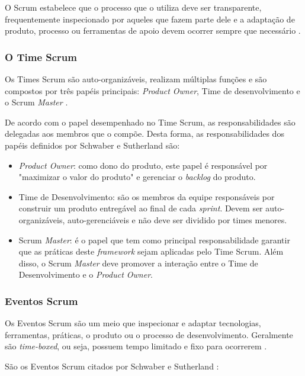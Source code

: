 O Scrum estabelece que o processo que o utiliza deve ser transparente, frequentemente inspecionado por aqueles que fazem parte dele e a adaptação de produto, processo ou ferramentas de apoio devem ocorrer sempre que necessário \cite{schwaber_guia_2013}.

\subsubsection{O Time Scrum}
Os Times Scrum são auto-organizáveis, realizam múltiplas funções e são compostos por três papéis principais: \textit{Product Owner}, Time de desenvolvimento e o Scrum \textit{Master} \cite{schwaber_guia_2013}.

De acordo com o papel desempenhado no Time Scrum, as responsabilidades são delegadas aos membros que o compõe. Desta forma, as responsabilidades dos papéis definidos por Schwaber e Sutherland \cite{schwaber_guia_2013} são:

\begin{itemize}
\item \textit{Product Owner}: como dono do produto, este papel é responsável por "maximizar o valor do produto" e gerenciar o \textit{backlog} do produto.

\item Time de Desenvolvimento: são os membros da equipe responsáveis por construir um produto entregável ao final de cada \textit{sprint}. Devem ser auto-organizáveis, auto-gerenciáveis e não deve ser dividido por times menores.

\item Scrum \textit{Master}: é o papel que tem como principal responsabilidade garantir que as práticas deste \textit{framework} sejam aplicadas pelo Time Scrum. Além disso, o Scrum \textit{Master} deve promover a interação entre o Time de Desenvolvimento e o \textit{Product Owner}.

\end{itemize}
\subsubsection{Eventos Scrum}
Os Eventos Scrum são um meio que inspecionar e adaptar tecnologias, ferramentas, práticas, o produto ou o processo de desenvolvimento. Geralmente são \textit{time-boxed}, ou seja, possuem tempo limitado e fixo para ocorrerem \cite{schwaber_guia_2013}.

São os Eventos Scrum citados por Schwaber e Sutherland \cite{schwaber_guia_2013}:

